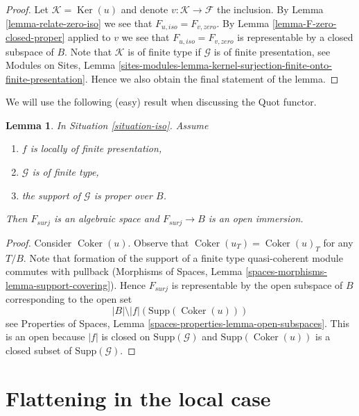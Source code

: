 \documentclass{stacks-project}
\theoremstyle{plain}
\newtheorem{lemma}[subsection]{Lemma}
\theoremstyle{definition}
\theoremstyle{remark}
\numberwithin{equation}{subsection}
\def\Ker{\mathop{\mathrm{Ker}}}
\def\Coker{\mathop{\mathrm{Coker}}}
\begin{document}
\begin{proof}
Let $\mathcal{K} = \Ker(u)$ and denote $v : \mathcal{K} \to \mathcal{F}$
the inclusion. By Lemma \ref{lemma-relate-zero-iso} we see that
$F_{u, iso} = F_{v, zero}$. By Lemma \ref{lemma-F-zero-closed-proper}
applied to $v$ we see that $F_{u, iso} = F_{v, zero}$ is representable
by a closed subspace of $B$. Note that $\mathcal{K}$ is of finite type
if $\mathcal{G}$ is of finite presentation, see
Modules on Sites, Lemma
\ref{sites-modules-lemma-kernel-surjection-finite-onto-finite-presentation}.
Hence we also obtain the final statement of the lemma.
\end{proof}

\noindent
We will use the following (easy) result when discussing the Quot functor.

\begin{lemma}
\label{lemma-F-surj-open}
In Situation \ref{situation-iso}. Assume
\begin{enumerate}
\item $f$ is locally of finite presentation,
\item $\mathcal{G}$ is of finite type,
\item the support of $\mathcal{G}$ is proper over $B$.
\end{enumerate}
Then $F_{surj}$ is an algebraic space and $F_{surj} \to B$
is an open immersion.
\end{lemma}

\begin{proof}
Consider $\Coker(u)$. Observe that
$\Coker(u_T) = \Coker(u)_T$ for any $T/B$.
Note that formation of the support of a finite type
quasi-coherent module commutes with pullback
(Morphisms of Spaces, Lemma \ref{spaces-morphisms-lemma-support-covering}).
Hence $F_{surj}$ is representable by the open subspace of $B$
corresponding to the open set
$$
|B| \setminus |f|(\text{Supp}(\Coker(u)))
$$
see Properties of Spaces, Lemma \ref{spaces-properties-lemma-open-subspaces}.
This is an open because $|f|$ is closed on $\text{Supp}(\mathcal{G})$
and $\text{Supp}(\Coker(u))$ is a closed subset of
$\text{Supp}(\mathcal{G})$.
\end{proof}






\section{Flattening in the local case}
\label{section-flattening-local}
\end{document}
